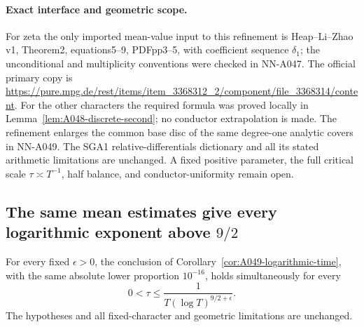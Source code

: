 \paragraph{Exact interface and geometric scope.}
For zeta the only imported mean-value input to this
refinement is Heap--Li--Zhao v1, Theorem2, equations5--9,
PDFpp3--5, with coefficient sequence \(\delta_1\);
the unconditional and multiplicity conventions were
checked in NN-A047. The official primary copy is
\url{https://pure.mpg.de/rest/items/item_3368312_2/component/file_3368314/content}.
For the other characters the required formula was proved
locally in Lemma~\ref{lem:A048-discrete-second}; no
conductor extrapolation is made. The refinement enlarges
the common base disc of the same degree-one analytic
covers in NN-A049. The SGA1 relative-differentials
dictionary and all its stated arithmetic limitations
are unchanged. A fixed positive parameter, the full
critical scale \(\tau\asymp T^{-1}\), half balance,
and conductor-uniformity remain open.



\subsection*{The same mean estimates give every logarithmic exponent above \(9/2\)}

\begin{corollary}
\label{cor:A049-logarithmic-sharp}
For every fixed \(\epsilon>0\), the conclusion of
Corollary~\ref{cor:A049-logarithmic-time}, with the same
absolute lower proportion \(10^{-16}\), holds
simultaneously for every
\[
                    0<\tau\le\frac1{T(\log T)^{9/2+\epsilon}}.
\]
The hypotheses and all fixed-character and geometric
limitations are unchanged.
\end{corollary}

